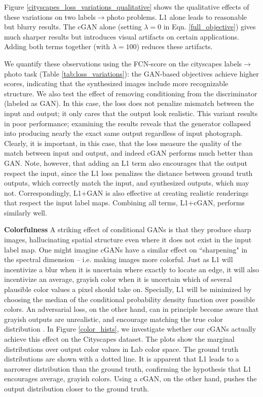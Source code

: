 Figure \ref{cityscapes_loss_variations_qualitative} shows the qualitative effects of these variations on two labels$\rightarrow$photo problems. L1 alone leads to reasonable but blurry results. The cGAN alone (setting $\lambda=0$ in Eqn. \ref{full_objective}) gives much sharper results but introduces visual artifacts on certain applications. Adding both terms together (with $\lambda=100$) reduces these artifacts.

We quantify these observations using the FCN-score on the cityscapes labels$\rightarrow$photo task (Table \ref{tab:loss_variations}): the GAN-based objectives achieve higher scores, indicating that the synthesized images include more recognizable structure. We also test the effect of removing conditioning from the discriminator (labeled as GAN). In this case, the loss does not penalize mismatch between the input and output; it only cares that the output look realistic. This variant results in poor performance; examining the results reveals that the generator collapsed into producing nearly the exact same output regardless of input photograph. Clearly, it is important, in this case, that the loss measure the quality of the match between input and output, and indeed cGAN performs much better than GAN. Note, however, that adding an L1 term also encourages that the output respect the input, since the L1 loss penalizes the distance between ground truth outputs, which correctly match the input, and synthesized outputs, which may not. Correspondingly, L1+GAN is also effective at creating realistic renderings that respect the input label maps. Combining all terms, L1+cGAN, performs similarly well.

{\bf Colorfulness} A striking effect of conditional GANs is that they produce sharp images, hallucinating spatial structure even where it does not exist in the input label map. One might imagine cGANs have a similar effect on ``sharpening" in the spectral dimension -- i.e. making images more colorful. Just as L1 will incentivize a blur when it is uncertain where exactly to locate an edge, it will also incentivize an average, grayish color when it is uncertain which of several plausible color values a pixel should take on. Specially, L1 will be minimized by choosing the median of the conditional probability density function over possible colors. An adversarial loss, on the other hand, can in principle become aware that grayish outputs are unrealistic, and encourage matching the true color distribution \cite{goodfellow2014generative}. In Figure \ref{color_hists}, we investigate whether our cGANs actually achieve this effect on the Cityscapes dataset. The plots show the marginal distributions over output color values in Lab color space. The ground truth distributions are shown with a dotted line. It is apparent that L1 leads to a narrower distribution than the ground truth, confirming the hypothesis that L1 encourages average, grayish colors. Using a cGAN, on the other hand, pushes the output distribution closer to the ground truth.

